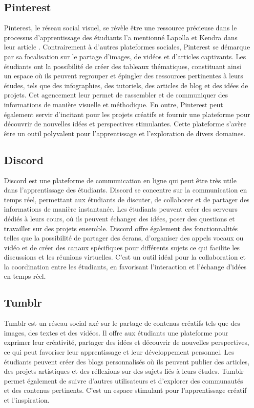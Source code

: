 \documentclass[12pt,a4paper,titlepage]{article}
\begin{document}
\subsection{Pinterest}
Pinterest, le réseau social visuel, se révèle être une ressource précieuse dans le processus d'apprentissage des étudiants l'a mentionné Lapolla et Kendra dans leur article \citep{lapolla2014pinterest}. Contrairement à d'autres plateformes sociales, Pinterest se démarque par sa focalisation sur le partage d'images, de vidéos et d'articles captivants. Les étudiants ont la possibilité de créer des tableaux thématiques, constituant ainsi un espace où ils peuvent regrouper et épingler des ressources pertinentes à leurs études, tels que des infographies, des tutoriels, des articles de blog et des idées de projets. Cet agencement leur permet de rassembler et de communiquer des informations de manière visuelle et méthodique. En outre, Pinterest peut également servir d'incitant pour les projets créatifs et fournir une plateforme pour découvrir de nouvelles idées et perspectives stimulantes. Cette plateforme s'avère être un outil polyvalent pour l'apprentissage et l'exploration de divers domaines.

\subsection{Discord}
Discord est une plateforme de communication en ligne qui peut être très utile dans l'apprentissage des étudiants. Discord se concentre sur la communication en temps réel, permettant aux étudiants de discuter, de collaborer et de partager des informations de manière instantanée. Les étudiants peuvent créer des serveurs dédiés à leurs cours, où ils peuvent échanger des idées, poser des questions et travailler sur des projets ensemble. Discord offre également des fonctionnalités telles que la possibilité de partager des écrans, d'organiser des appels vocaux ou vidéo et de créer des canaux spécifiques pour différents sujets ce qui facilite les discussions et les réunions virtuelles. C'est un outil idéal pour la collaboration et la coordination entre les étudiants, en favorisant l'interaction et l'échange d'idées en temps réel.

\subsection{Tumblr}
Tumblr est un réseau social axé sur le partage de contenus créatifs tels que des images, des textes et des vidéos. Il offre aux étudiants une plateforme pour exprimer leur créativité, partager des idées et découvrir de nouvelles perspectives, ce qui peut favoriser leur apprentissage et leur développement personnel. Les étudiants peuvent créer des blogs personnalisés où ils peuvent publier des articles, des projets artistiques et des réflexions sur des sujets liés à leurs études. Tumblr permet également de suivre d'autres utilisateurs et d'explorer des communautés et des contenus pertinents. C'est un espace stimulant pour l'apprentissage créatif et l'inspiration.
\end{document}
